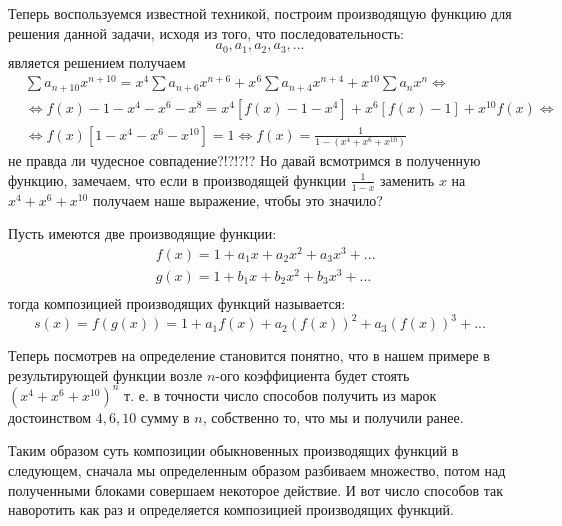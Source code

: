 Теперь воспользуемся известной техникой, построим производящую функцию для решения данной задачи, исходя из того, что последовательность:
\[
	a_0, a_1, a_2, a_3, ...
\]
является решением получаем
\[
	\begin{split}
		& \sum a_{n+10} x^{n+10} = x^4 \sum a_{n+6} x^{n+6} + x^6 \sum a_{n+4} x^{n+4} + x^{10} \sum a_n x^{n} \Leftrightarrow \\
		& \Leftrightarrow f\left(x\right) - 1 - x^4 - x^6 - x^8 = x^4 \left[f\left(x\right) - 1 - x^4\right] + x^6 \left[f\left(x\right) - 1\right] + x^{10} f\left(x\right) \Leftrightarrow \\
		& \Leftrightarrow f\left(x\right) \left[1 - x^4 - x^6 - x^{10}\right] = 1 \Leftrightarrow f\left(x\right) = \frac{1}{1 - \left(x^4 + x^6 + x^{10}\right)}
	\end{split}
\]
не правда ли чудесное совпадение?!?!?!? Но давай всмотримся в полученную функцию, замечаем, что если в производящей функции $\frac{1}{1 - x}$ заменить $x$ на $x^4 + x^6 + x^{10}$ получаем наше выражение, чтобы это значило?

\begin{Def}
Пусть имеются две производящие функции:
\[
	\begin{split}
		& f\left(x\right) = 1 + a_1 x + a_2 x^2 + a_3 x^3 + ... \\
		& g\left(x\right) = 1 + b_1 x + b_2 x^2 + b_3 x^3 + ... \\
	\end{split}
\]
тогда композицией производящих функций называется:
\[
	s\left(x\right) = f\left(g\left(x\right)\right) = 1 + a_1 f\left(x\right) + a_2 \left(f\left(x\right)\right)^2 + a_3 \left(f\left(x\right)\right)^3 + ...
\]
\end{Def}

Теперь посмотрев на определение становится понятно, что в нашем примере в результирующей функции возле $n$-ого коэффициента будет стоять $\left(x^4 + x^6 + x^10\right)^n$ т. е. в точности число способов получить из марок достоинством $4, 6, 10$ сумму в $n$, собственно то, что мы и получили ранее.

Таким образом суть композиции обыкновенных производящих функций в следующем, сначала мы определенным образом разбиваем множество, потом над полученными блоками совершаем некоторое действие. И вот число способов так наворотить как раз и определяется композицией производящих функций.
